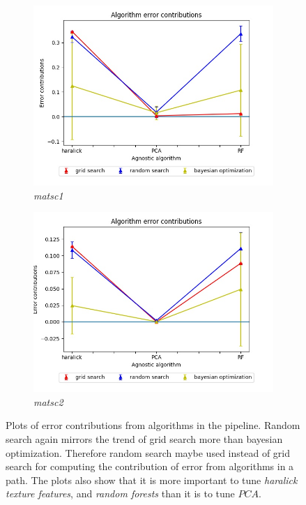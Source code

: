 \begin{figure}[ht!]
\begin{subfigure}{.5\textwidth}
  \centering
  \includegraphics[scale=0.37]{img/EP/agnostic_error_alg_matsc_dataset1}
  \caption{\textit{matsc1}}
  \label{fig:sfig3}
\end{subfigure}%
\begin{subfigure}{.5\textwidth}
  \centering
  \includegraphics[scale=0.37]{img/EP/agnostic_error_alg_matsc_dataset2}
  \caption{\textit{matsc2}}
  \label{fig:sfig4}
\end{subfigure}

\caption{Plots of error contributions from algorithms in the pipeline. Random search again mirrors the trend of grid search more than bayesian optimization. Therefore random search maybe used instead of grid search for computing the contribution of error from algorithms in a path. The plots also show that it is more important to tune \textit{haralick texture features}, and \textit{random forests} than it is to tune  $PCA$. }
\label{fig:fig}
\end{figure}

